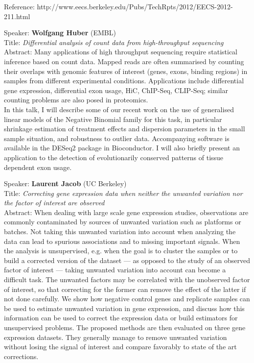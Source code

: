 \documentclass[11pt]{article}
\begin{document}
\noindent Reference:
http://www.eecs.berkeley.edu/Pubs/TechRpts/2012/EECS-2012-211.html

\bigskip
\noindent
Speaker: {\bf Wolfgang Huber} (EMBL)\\
Title: {\it Differential analysis of count data from high-throughput sequencing}\\
Abstract: Many applications of high throughput sequencing require
statistical inference based on count data. Mapped reads are often
summarised by counting their overlaps with genomic features of
interest (genes, exons, binding regions) in samples from different
experimental conditions. Applications include differential gene
expression, differential exon usage, HiC, ChIP-Seq, CLIP-Seq; similar
counting problems are also posed in proteomics.\\

\noindent In this talk, I will describe some of our recent work on the use of
generalised linear models of the Negative Binomial family for this
task, in particular shrinkage estimation of treatment effects and
dispersion parameters in the small sample situation, and robustness to
outlier data. Accompanying software is available in the DESeq2 package
in Bioconductor. I will also briefly present an application to the
detection of evolutionarily conserved patterns of tissue dependent
exon usage.

\bigskip
\noindent
Speaker: {\bf Laurent Jacob} (UC Berkeley)\\
Title: {\it Correcting gene expression data when neither the unwanted variation nor the factor of interest are observed}\\
Abstract: When dealing with large scale gene expression studies,
observations are commonly contaminated by sources of unwanted
variation such as platforms or batches. Not taking this unwanted
variation into account when analyzing the data can lead to spurious
associations and to missing important signals. When the analysis is
unsupervised, e.g. when the goal is to cluster the samples or to build
a corrected version of the dataset --- as opposed to the study of an
observed factor of interest --- taking unwanted variation into account
can become a difficult task. The unwanted factors may be correlated
with the unobserved factor of interest, so that correcting for the
former can remove the effect of the latter if not done carefully. We
show how negative control genes and replicate samples can be used to
estimate unwanted variation in gene expression, and discuss how this
information can be used to correct the expression data or build
estimators for unsupervised problems. The proposed methods are then
evaluated on three gene expression datasets. They generally manage to
remove unwanted variation without losing the signal of interest and
compare favorably to state of the art corrections.
\end{document}
